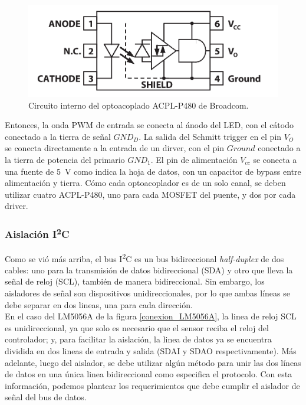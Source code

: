 \begin{figure}[h]
    \centering
    \includegraphics[scale=0.9]{Imagenes/ACPL-P480.png}
    \caption{Circuito interno del optoacoplado ACPL-P480 de Broadcom.}
    \label{circ_interno_opto}
\end{figure}

Entonces, la onda PWM de entrada se conecta al ánodo del LED, con el cátodo conectado a la tierra de señal $GND_D$. La salida del Schmitt trigger en el pin $V_O$ se conecta directamente a la entrada de un dirver, con el pin $Ground$ conectado a la tierra de potencia del primario $GND_1$. El pin de alimentación $V_{cc}$ se conecta a una fuente de \SI[]{5}[]{\volt} como indica la hoja de datos, con un capacitor de bypass entre alimentación y tierra. Cómo cada optoacoplador es de un solo canal, se deben utilizar cuatro ACPL-P480, uno para cada MOSFET del puente, y dos por cada driver.\\

\subsubsection{Aislación I\textsuperscript{2}C}

Como se vió más arriba, el bus I\textsuperscript{2}C es un bus bidireccional \textit{half-duplex} de dos cables: uno para la transmisión de datos bidireccional (SDA) y otro que lleva la señal de reloj (SCL), también de manera bidireccional. Sin embargo, los aisladores de señal son dispositivos unidireccionales, por lo que ambas líneas  se debe separar en dos lineas, una para cada dirección.\\

En el caso del LM5056A de la figura \ref{conexion_LM5056A}, la linea de reloj SCL es unidireccional, ya que solo es necesario que el sensor reciba el reloj del controlador; y, para facilitar la aislación, la linea de datos ya se encuentra dividida en dos lineas de entrada y salida (SDAI y SDAO respectivamente). Más adelante, luego del aislador, se debe utilizar algún método para unir las dos líneas de datos en una única linea bidireccional como especifica el protocolo. Con esta información, podemos plantear los requerimientos que debe cumplir el aislador de señal del bus de datos.\\

